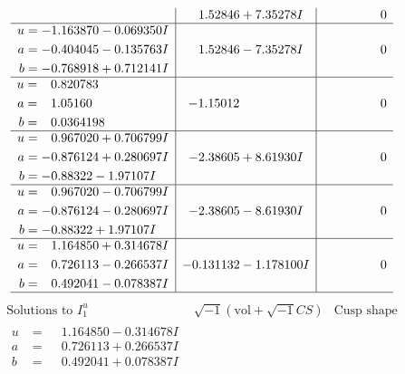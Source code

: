 \documentclass[1p]{elsarticle_modified}
\theoremstyle{definition}
\newcommand{\I}{\sqrt{-1}}
\begin{document}
$$\begin{array}{c|c|c}
 & \phantom{-}1.52846 + 7.35278 I & \phantom{-0.000000 } 0 \\ \hline\begin{aligned}
u &= -1.163870 - 0.069350 I \\
a &= -0.404045 - 0.135763 I \\
b &= -0.768918 + 0.712141 I\end{aligned}
 & \phantom{-}1.52846 - 7.35278 I & \phantom{-0.000000 } 0 \\ \hline\begin{aligned}
u &= \phantom{-}0.820783\phantom{ +0.000000I} \\
a &= \phantom{-}1.05160\phantom{ +0.000000I} \\
b &= \phantom{-}0.0364198\phantom{ +0.000000I}\end{aligned}
 & -1.15012\phantom{ +0.000000I} & \phantom{-0.000000 } 0 \\ \hline\begin{aligned}
u &= \phantom{-}0.967020 + 0.706799 I \\
a &= -0.876124 + 0.280697 I \\
b &= -0.88322 - 1.97107 I\end{aligned}
 & -2.38605 + 8.61930 I & \phantom{-0.000000 } 0 \\ \hline\begin{aligned}
u &= \phantom{-}0.967020 - 0.706799 I \\
a &= -0.876124 - 0.280697 I \\
b &= -0.88322 + 1.97107 I\end{aligned}
 & -2.38605 - 8.61930 I & \phantom{-0.000000 } 0 \\ \hline\begin{aligned}
u &= \phantom{-}1.164850 + 0.314678 I \\
a &= \phantom{-}0.726113 - 0.266537 I \\
b &= \phantom{-}0.492041 - 0.078387 I\end{aligned}
 & -0.131132 - 1.178100 I & \phantom{-0.000000 } 0\\
 \hline 
 \end{array}$$\newpage$$\begin{array}{c|c|c}  
\text{Solutions to }I^u_{1}& \I (\text{vol} + \sqrt{-1}CS) & \text{Cusp shape}\\
 \hline 
\begin{aligned}
u &= \phantom{-}1.164850 - 0.314678 I \\
a &= \phantom{-}0.726113 + 0.266537 I \\
b &= \phantom{-}0.492041 + 0.078387 I\end{aligned}

\end{array}$$
\end{document}
